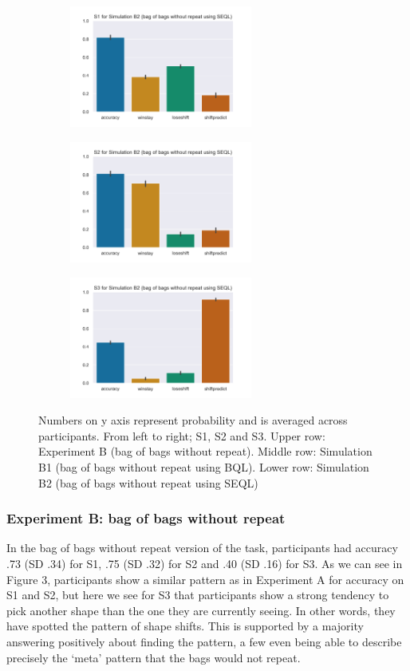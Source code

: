 \documentclass[10pt,letterpaper]{article}
\begin{document}
\begin{figure}[t]
\begin{subfigure}{0.33\textwidth}
\includegraphics[width=0.9\linewidth, height=4cm]{plots/simB2_s1.png} 
\label{fig:simB21}
\end{subfigure}
\begin{subfigure}{0.33\textwidth}
\includegraphics[width=0.9\linewidth, height=4cm]{plots/simB2_s2.png}
\label{fig:simB22}
\end{subfigure}
\begin{subfigure}{0.33\textwidth}
\includegraphics[width=0.9\linewidth, height=4cm]{plots/simB2_s3.png}
\label{fig:simB23}
\end{subfigure}
 
\caption{Numbers on y axis represent probability and is averaged across participants. From left to right; S1, S2 and S3. Upper row: Experiment B (bag of bags without repeat). Middle row: Simulation B1 (bag of bags without repeat using BQL). Lower row: Simulation B2 (bag of bags without repeat using SEQL)}
\label{fig:figure3}
\end{figure}

\subsubsection{Experiment B: bag of bags without repeat}
In the bag of bags without repeat version of the task, participants had accuracy .73 (SD .34) for S1, .75 (SD .32) for S2 and .40 (SD .16) for S3. As we can see in Figure 3, participants show a similar pattern as in Experiment A for accuracy on S1 and S2, but here we see for S3 that participants show a strong tendency to pick another shape than the one they are currently seeing. In other words, they have spotted the pattern of shape shifts. This is supported by a majority answering positively about finding the pattern, a few even being able to describe precisely the ‘meta’ pattern that the bags would not repeat.
\end{document}
